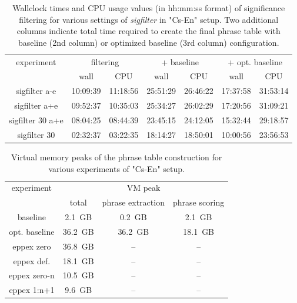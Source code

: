 \begin{table}[ht]
\centering
\begin{tabular}{ | c | c c | c c | c c | }
\hline
experiment & \multicolumn{2}{|c|}{filtering} & \multicolumn{2}{|c|}{+ baseline} & \multicolumn{2}{|c|}{+ opt. baseline} \\
 & wall & CPU & wall & CPU & wall & CPU \\
\hline
\hline
sigfilter a-e     & 10:09:39 & 11:18:56 & 25:51:29 & 26:46:22 & 17:37:58 & 31:53:14 \\
sigfilter a+e     & 09:52:37 & 10:35:03 & 25:34:27 & 26:02:29 & 17:20:56 & 31:09:21 \\
sigfilter 30 a+e  & 08:04:25 & 08:44:39 & 23:45:15 & 24:12:05 & 15:32:44 & 29:18:57 \\
sigfilter 30      & 02:32:37 & 03:22:35 & 18:14:27 & 18:50:01 & 10:00:56 & 23:56:53 \\
\hline
\end{tabular}
\caption{\label{cs-en-wmt13-sigfilter-time-benchmarks}
Wallclock times and CPU usage values (in hh:mm:ss format) of significance filtering
for various settings of \emph{sigfilter} in "Cs-En" setup.
Two additional columns indicate total time required to create the final phrase table
with baseline (2nd column) or optimized baseline (3rd column) configuration.}
\end{table}


\begin{table}[ht]
\centering
\begin{tabular}{ | c | c c c | }
\hline
experiment & \multicolumn{3}{|c|}{VM peak} \\
 & total & phrase extraction & phrase scoring \\
\hline
\hline
baseline       &  2.1~GB &  0.2~GB &  2.1~GB \\
opt. baseline  & 36.2~GB & 36.2~GB & 18.1~GB \\
eppex zero     & 36.8~GB &      -- &      -- \\
\hline
eppex def.     & 18.1~GB &      -- &      -- \\
eppex zero-n   & 10.5~GB &      -- &      -- \\
eppex 1:n+1    &  9.6~GB &      -- &      -- \\
\hline
\end{tabular}
\caption{\label{cs-en-wmt13-vm-peak-benchmarks}Virtual memory peaks of
the phrase table construction for various experiments of "Cs-En" setup.}
\end{table}

